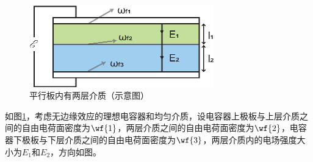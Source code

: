 



\begin{figure}[h]
    \centering
    \includegraphics[width=8cm]{img/1.2/电容器.eps}
    \caption{平行板内有两层介质（示意图）}
    \label{1.2_fig:电容器}
\end{figure}

如图\ref{1.2_fig:电容器}，考虑无边缘效应的理想电容器和均匀介质，设电容器上极板与上层介质之间的自由电荷面密度为$\wf{1}$，两层介质之间的自由电荷面密度为$\wf{2}$，电容器下极板与下层介质之间的自由电荷面密度为$\wf{3}$，两层介质内的电场强度大小为$E_1$和$E_2$，方向如图。

